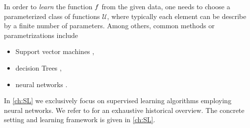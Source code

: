 In order to \emph{learn} the function $f$ from the given data, one needs to choose a parameterized class of functions $\mathcal{U}$, where typically each element can be describe by a finite number of parameters. Among others, common methods or parametrizations include
%
\begin{itemize}
\item Support vector machines \cite{cortes1995support, scholkopf2005support},
\item decision Trees \cite{morgan1963problems, Brei},
\item neural networks \cite{Turing,rosenblatt1958perceptron, minsky1969introduction}.
\end{itemize}
%
In \cref{ch:SL} we exclusively focus on supervised learning algorithms employing neural networks. We refer to \cite{SCHMIDHUBER201585} for an exhaustive historical overview. The concrete setting and learning framework is given in \cref{ch:SL}.
%
%
%
